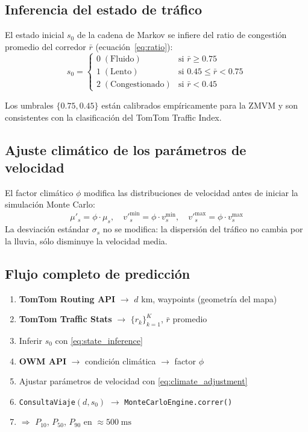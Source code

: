 \documentclass[12pt, a4paper]{article}
\theoremstyle{definition}
\begin{document}
\subsection{Inferencia del estado de tráfico}

El estado inicial $s_0$ de la cadena de Markov se infiere del ratio de
congestión promedio del corredor $\bar{r}$ (ecuación~\eqref{eq:ratio}):
\begin{equation}
    s_0 =
    \begin{cases}
        0 \;(\text{Fluido})        & \text{si } \bar{r} \geq 0.75 \\
        1 \;(\text{Lento})         & \text{si } 0.45 \leq \bar{r} < 0.75 \\
        2 \;(\text{Congestionado}) & \text{si } \bar{r} < 0.45
    \end{cases}
    \label{eq:state_inference}
\end{equation}

Los umbrales $\{0.75, 0.45\}$ están calibrados empíricamente para la ZMVM
y son consistentes con la clasificación del TomTom Traffic Index.

\subsection{Ajuste climático de los parámetros de velocidad}

El factor climático $\phi$ modifica las distribuciones de velocidad antes de
iniciar la simulación Monte Carlo:
\begin{equation}
    \mu'_s = \phi \cdot \mu_s, \quad
    v'^{\text{min}}_s = \phi \cdot v^{\text{min}}_s, \quad
    v'^{\text{max}}_s = \phi \cdot v^{\text{max}}_s
    \label{eq:climate_adjustment}
\end{equation}
La desviación estándar $\sigma_s$ no se modifica: la dispersión del tráfico
no cambia por la lluvia, sólo disminuye la velocidad media.

\subsection{Flujo completo de predicción}

\begin{enumerate}
    \item \textbf{TomTom Routing API} $\to$ $d$ km, waypoints (geometría del mapa)
    \item \textbf{TomTom Traffic Stats} $\to$ $\{r_k\}_{k=1}^{K}$, $\bar{r}$ promedio
    \item Inferir $s_0$ con \eqref{eq:state_inference}
    \item \textbf{OWM API} $\to$ condición climática $\to$ factor $\phi$
    \item Ajustar parámetros de velocidad con \eqref{eq:climate_adjustment}
    \item \texttt{ConsultaViaje}$(d, s_0)$ $\to$ \texttt{MonteCarloEngine.correr()}
    \item $\Rightarrow$ $P_{10}$, $P_{50}$, $P_{90}$ en $\approx 500\;\text{ms}$
\end{enumerate}
\end{document}

